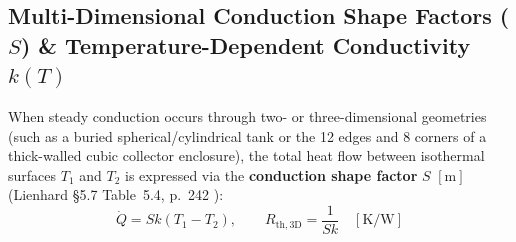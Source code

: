 \subsection{Multi-Dimensional Conduction Shape Factors ($S$) \& Temperature-Dependent Conductivity $k(T)$}
When steady conduction occurs through two- or three-dimensional geometries (such as a buried spherical/cylindrical tank or the 12 edges and 8 corners of a thick-walled cubic collector enclosure), the total heat flow between isothermal surfaces $T_1$ and $T_2$ is expressed via the \textbf{conduction shape factor} $S$ $[\si{\meter}]$ (Lienhard §5.7 Table~5.4, p.~242 ):
\begin{equation}
  \dot{Q} = S k \left(T_1 - T_2\right), \qquad R_{\mathrm{th,3D}} = \frac{1}{S k} \quad [\si{\kelvin\per\watt}]
  \label{eq:10:shape-factor}
\end{equation}

